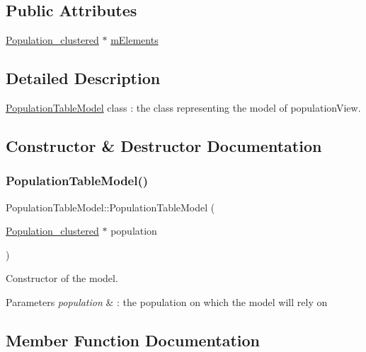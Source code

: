 \subsection*{Public Attributes}
\begin{DoxyCompactItemize}
\item 
\hyperlink{class_population__clustered}{Population\+\_\+clustered} $\ast$ \hyperlink{class_population_table_model_a3ee2ae16c64538e01d221f89da1fdc40}{m\+Elements}
\end{DoxyCompactItemize}


\subsection{Detailed Description}
\hyperlink{class_population_table_model}{Population\+Table\+Model} class \+: the class representing the model of population\+View. 

\subsection{Constructor \& Destructor Documentation}
\mbox{\label{class_population_table_model_adccce4753330371cd2d3ed12090f2709}} 
\subsubsection{\texorpdfstring{Population\+Table\+Model()}{PopulationTableModel()}}
{\footnotesize\ttfamily Population\+Table\+Model\+::\+Population\+Table\+Model (\begin{DoxyParamCaption}\item[{\hyperlink{class_population__clustered}{Population\+\_\+clustered} $\ast$}]{population }\end{DoxyParamCaption})}



Constructor of the model. 


\begin{DoxyParams}{Parameters}
{\em population} & \+: the population on which the model will rely on \\
\hline
\end{DoxyParams}


\subsection{Member Function Documentation}
\mbox{\label{class_population_table_model_a8a54cdbc4dd1e296224e5c833a61c2ba}} 
